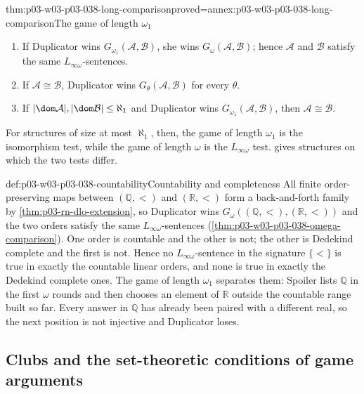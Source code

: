 \begin{hbtheorem}{thm:p03-w03-p03-038-long-comparison}{proved=annex:p03-w03-p03-038-long-comparison}{The game of length \(\omega_1\)}
\begin{enumerate}
\item If Duplicator wins \(G_{\omega_1}(\mathcal A,\mathcal B)\), she wins
      \(G_\omega(\mathcal A,\mathcal B)\); hence
      \(\mathcal A\) and \(\mathcal B\) satisfy the same
      \(L_{\infty\omega}\)-sentences.
\item If \(\mathcal A\cong\mathcal B\), Duplicator wins
      \(G_\theta(\mathcal A,\mathcal B)\) for every \(\theta\).
\item If \(|\dom\mathcal A|,|\dom\mathcal B|\le\aleph_1\) and Duplicator wins
      \(G_{\omega_1}(\mathcal A,\mathcal B)\), then
      \(\mathcal A\cong\mathcal B\).
\end{enumerate}
\end{hbtheorem}

For structures of size at most \(\aleph_1\), then, the game of length
\(\omega_1\) is the isomorphism test, while the game of length \(\omega\) is
the \(L_{\infty\omega}\) test.  gives
structures on which the two tests differ.

\begin{hbexample}{def:p03-w03-p03-038-countability}{Countability and completeness}
All finite order-preserving maps between \((\mathbb Q,<)\) and
\((\mathbb R,<)\) form a back-and-forth family by
\cref{thm:p03-rn-dlo-extension}, so Duplicator wins
\(G_\omega((\mathbb Q,<),(\mathbb R,<))\) and the two orders satisfy the same
\(L_{\infty\omega}\)-sentences (\cref{thm:p03-w03-p03-038-omega-comparison}).
One order is countable and the other is not; the other is Dedekind complete
and the first is not. Hence no \(L_{\infty\omega}\)-sentence in the
signature \(\{<\}\) is true in exactly the countable linear orders, and none
is true in exactly the Dedekind complete ones. The game of length
\(\omega_1\) separates them: Spoiler lists \(\mathbb Q\) in the first
\(\omega\) rounds and then chooses an element of \(\mathbb R\) outside the
countable range built so far. Every answer in \(\mathbb Q\) has already
been paired with a different real, so the next position is not injective
and Duplicator loses.
\end{hbexample}

\subsection{Clubs and the set-theoretic conditions of game arguments}
\label{sec:p03-w03-p03-038-clubs}

